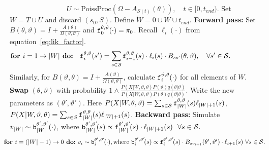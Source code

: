 \begin{algorithm}[H]
\begin{algorithmic}[1]
    \vspace{-.05in}
    $\qquad \qquad \qquad \qquad U \sim \text{PoissProc}(\Omega - A_{S(t)}(\theta)), \quad t \in [0,t_{end})$.
    \State Set $W = T \cup U$ and discard $(s_0,S)$. Define $\tilde{W} = 0 \cup W \cup t_{end}$.
    \State \textbf{Forward pass:} Set $B(\theta,\vartheta) = I + \frac{A(\theta)}{\Omega(\theta, \vartheta)}$ and $\mathtt{f}^{\theta, \vartheta}_0(\cdot) = \pi_0$. Recall $\ell_i(\cdot)$ from equation~\eqref{eq:lik_factor}.
    \vspace{-.25in}
        $$\textbf{for } i=1\rightarrow |{W}|\textbf{ do:} \quad \fwd^{\theta,\vartheta}_i(s') = \sum_{s \in \cS} \fwd^{\theta,\vartheta}_{i-1}(s)\cdot \ell_{i}(s) \cdot B_{ss'}(\theta,\vartheta), \quad \forall s' \in \cS.\qquad\qquad\quad
    \vspace{-.1in}
        $$
        Similarly, for $B(\vartheta,\theta) = I + \frac{A(\vartheta)}{\Omega(\vartheta, \theta)}$, calculate $\mathtt{f}^{\vartheta,\theta}_i(\cdot)$ for all elements of ${W}$.
    \State \textbf{Swap} 
    $(\theta, \vartheta)$ with probability
     $
     1 \wedge \frac{P(X| W,\vartheta,\theta)P(\vartheta)q(\theta|\vartheta)}
        {P(X| W,\theta, \vartheta)P(\theta) q(\vartheta|\theta)}.
        $
    Write the new parameters as $(\theta',\vartheta')$.
        Here $P(X|W,\theta,\vartheta) = \sum_{s \in {\mathcal S}} \mathtt{f}^{\theta,\vartheta}_{|W|}(s)\ell_{|W|+1}(s)$, $P(X|W,\vartheta,\theta) = \sum_{s \in {\mathcal S}} \mathtt{f}^{\vartheta,\theta}_{|W|}(s)\ell_{|W|+1}(s)$.
    \State \textbf{Backward pass:}
    Simulate $v_{|W|} \sim \mathtt{b}^{\theta',\vartheta'}_{|W|}(\cdot)$, where $\mathtt{b}^{\theta',\vartheta'}_{|W|}\!(s) \propto \mathtt{f}^{\theta',\vartheta'}_{|W|}\!(s)\cdot\ell_{|W|+1}(s) \ \  \forall s \in {\mathcal S}.$ 
    \vspace{-.25in}
    $$\hspace{-.15in} \textbf{for } i=(|W|-1)\rightarrow 0\textbf{ do:} \ v_i \sim \bck^{\theta',\vartheta'}_i\!(\cdot), \text{where } 
    \bck^{\theta',\vartheta'}_i\!(s) \propto \fwd^{\theta',\vartheta'}_i\!(s)\cdot B_{sv_{i+1}}(\theta',\vartheta') \cdot \ell_{i+1}(s)  \ \forall s \in \cS.$$
    

\end{algorithmic}
\end{algorithm}
